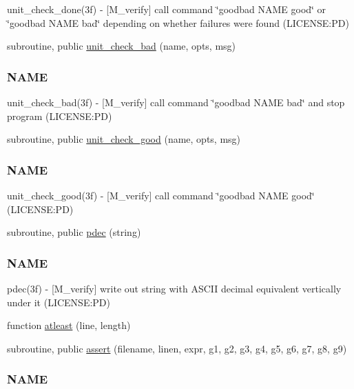 \begin{DoxyCompactItemize}
\begin{DoxyCompactList}
unit\+\_\+check\+\_\+done(3f) -\/ \mbox{[}M\+\_\+verify\mbox{]} call command \char`\"{}goodbad N\+A\+M\+E good\char`\"{} or \char`\"{}goodbad N\+A\+M\+E bad\char`\"{} depending on whether failures were found (L\+I\+C\+E\+N\+SE\+:PD) \end{DoxyCompactList}\item 
subroutine, public \mbox{\hyperlink{namespacem__verify_aaa2744e5ab1687072183869bd53cc086}{unit\+\_\+check\+\_\+bad}} (name, opts, msg)
\begin{DoxyCompactList}\small\item\em \subsubsection*{N\+A\+ME}

unit\+\_\+check\+\_\+bad(3f) -\/ \mbox{[}M\+\_\+verify\mbox{]} call command \char`\"{}goodbad N\+A\+M\+E bad\char`\"{} and stop program (L\+I\+C\+E\+N\+SE\+:PD) \end{DoxyCompactList}\item 
subroutine, public \mbox{\hyperlink{namespacem__verify_a9d5ed59a1ac977dd7ab23e0d1fb54de4}{unit\+\_\+check\+\_\+good}} (name, opts, msg)
\begin{DoxyCompactList}\small\item\em \subsubsection*{N\+A\+ME}

unit\+\_\+check\+\_\+good(3f) -\/ \mbox{[}M\+\_\+verify\mbox{]} call command \char`\"{}goodbad N\+A\+M\+E good\char`\"{} (L\+I\+C\+E\+N\+SE\+:PD) \end{DoxyCompactList}\item 
subroutine, public \mbox{\hyperlink{namespacem__verify_aa772ce395fd2e4cc546b8645d8fd9949}{pdec}} (string)
\begin{DoxyCompactList}\small\item\em \subsubsection*{N\+A\+ME}

pdec(3f) -\/ \mbox{[}M\+\_\+verify\mbox{]} write out string with A\+S\+C\+II decimal equivalent vertically under it (L\+I\+C\+E\+N\+SE\+:PD) \end{DoxyCompactList}\item 
function \mbox{\hyperlink{namespacem__verify_a6185c00609b8f0e4c5a503cfadcb2490}{atleast}} (line, length)
\item 
subroutine, public \mbox{\hyperlink{namespacem__verify_a83a6bafddb101d8b0fe70f34827836ff}{assert}} (filename, linen, expr, g1, g2, g3, g4, g5, g6, g7, g8, g9)
\begin{DoxyCompactList}\small\item\em \subsubsection*{N\+A\+ME}


\end{DoxyCompactList}
\end{DoxyCompactItemize}
